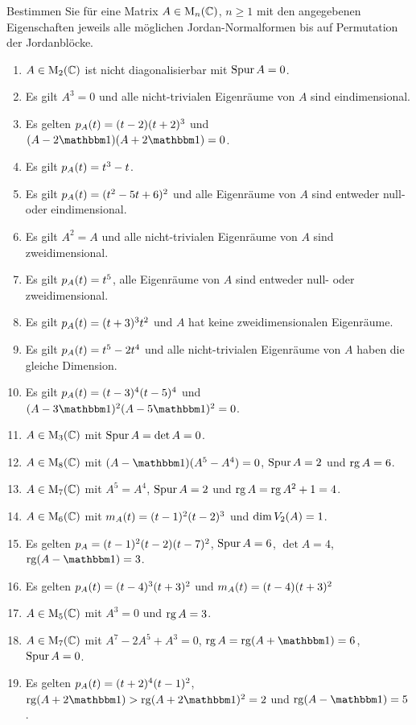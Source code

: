 \documentclass[a4paper, 10pt]{scrartcl}
\begin{document}
\begin{question}
  Bestimmen Sie für eine Matrix $A \in \matrices{n}{\Complex}$, $n \geq 1$ mit den angegebenen Eigenschaften jeweils alle möglichen Jordan-Normalformen bis auf Permutation der Jordanblöcke.
  \begin{enumerate}
    \item
      $A\in \matrices{2}{\Complex}$ ist nicht diagonalisierbar mit $\tr A = 0$.
    \item
      Es gilt $A^3 = 0$ und alle nicht-trivialen Eigenräume von $A$ sind eindimensional.
    \item
      Es gelten $\charpol{A}(t) = (t-2)(t+2)^3$ und $(A - 2 \Id)(A + 2 \Id) = 0$.
    \item
      Es gilt $\charpol{A}(t) = t^3 - t$.
    \item
      Es gilt $\charpol{A}(t) = (t^2 - 5t + 6)^2$ und alle Eigenräume von $A$ sind entweder null- oder eindimensional.
    \item
      Es gilt $A^2 = A$ und alle nicht-trivialen Eigenräume von $A$ sind zweidimensional.
    \item
      Es gilt $\charpol{A}(t) = t^5$, alle Eigenräume von $A$ sind entweder null- oder zweidimensional.
    \item
      Es gilt $\charpol{A}(t) = (t + 3)^3 t^2$ und $A$ hat keine zweidimensionalen Eigenräume.
    \item
      Es gilt $\charpol{A}(t) = t^5 -2 t^4$ und alle nicht-trivialen Eigenräume von $A$ haben die gleiche Dimension.
    \item
      Es gilt $\charpol{A}(t) = (t-3)^4 (t-5)^4$ und $(A - 3 \Id)^2 (A - 5 \Id)^2 = 0$.
    \item
      $A \in \matrices{3}{\Complex}$ mit $\tr A = \det A = 0$.
    \item
      $A \in \matrices{8}{\Complex}$ mit $(A - \Id)(A^5 - A^4) = 0$, $\tr A = 2$ und $\rank A = 6$.
    \item
      $A \in \matrices{7}{\Complex}$ mit $A^5 = A^4$, $\tr A = 2$ und $\rank A = \rank A^2 + 1 = 4$.
    \item
      $A \in \matrices{6}{\Complex}$ mit $\minpol{A}(t) = (t-1)^2 (t-2)^3$ und $\dim \eigenspace{V}{A}{2} = 1$.
    \item
      Es gelten $\charpol{A} = (t-1)^2 (t-2) (t-7)^2$, $\tr A = 6$, $\det A = 4$, $\rank (A - \Id) = 3$.
    \item
      Es gelten $\charpol{A}(t) = (t-4)^3 (t+3)^2$ und $\minpol{A}(t) = (t-4) (t+3)^2$
    \item
      $A \in \matrices{5}{\Complex}$ mit $A^3 = 0$ und $\rank A = 3$.
    \item
      $A \in \matrices{7}{\Complex}$ mit $A^7 - 2 A^5 + A^3 = 0$, $\rank A = \rank(A + \Id) = 6$, $\tr A = 0$.
    \item
      Es gelten $\charpol{A}(t) = (t+2)^4 (t-1)^2$, $\rank (A + 2 \Id) > \rank (A + 2 \Id)^2 = 2$ und $\rank (A - \Id) = 5$.
  \end{enumerate}
\end{question}
\end{document}
